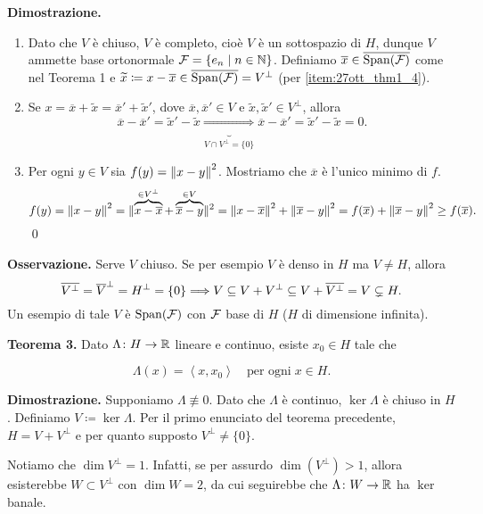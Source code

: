 \textbf{Dimostrazione.}
\begin{enumerate}
\item Dato che $V$ è chiuso, $V$ è completo, cioè $V$ è un sottospazio di $H$, dunque $V$ ammette base ortonormale $\mathcal{F} = \left\{ e_n \;\middle|\; n \in \mathbb N \right\}$.
Definiamo $\overline{x} \in \overline{\operatorname{Span}(\mathcal{F})}$ come nel Teorema 1 e $\widetilde{x} \coloneqq x - \overline{x} \in \overline{\operatorname{Span}(\mathcal{F})} = V^\perp$ (per \ref{item:27ott_thm1_4}).

\item Se $x = \overline{x} + \tilde{x} = \overline{x}' + \tilde{x}'$, dove $\overline{x}, \overline{x}' \in V$ e $\tilde{x}, \tilde{x}' \in V^\perp$, allora
%
$$
\overline{x} - \overline{x}' = \tilde{x}' - \tilde{x} \underbrace{\Longrightarrow}_{V \cap V^\perp = \{0 \} }
\overline{x} - \overline{x}' = \tilde{x}' - \tilde{x} = 0.
$$
%

\item Per ogni $y \in V$ sia $f(y) = \left\lVert x - y \right\rVert^2$. Mostriamo che $\overline{x}$ è l'unico minimo di $f$.
%
$$
f(y) = \left\lVert x - y \right\rVert^2 = \lVert{\overbrace{x - \overline{x}}^{\in V^\perp} + \overbrace{\overline{x} - y}^{\in V}}\rVert^2 = \left\lVert x - \overline{x} \right\rVert^2 + \left\lVert \overline{x} - y \right\rVert^2
= f(\overline{x}) + \left\lVert \overline{x} - y \right\rVert^2 \geq f(\overline{x}).
$$
%
\qed
\end{enumerate}

\vs

\textbf{Osservazione.}
Serve $V$ chiuso. Se per esempio $V$ è denso in $H$ ma $V \neq H$, allora
%
$$
\overline{V^\perp} = \overline{V}^\perp = H^\perp = \{0\} \Longrightarrow V \subseteq V + V^\perp \subseteq V + \overline{V^\perp} = V \subsetneq H.
$$
%
Un esempio di tale $V$ è $\operatorname{Span}(\mathcal{F})$ con $\mathcal{F}$ base di $H$ ($H$ di dimensione infinita).

\textbf{Teorema 3.} Dato $\Lambda \colon  H \to \mathbb R$ lineare e continuo, esiste $x_0 \in H$ tale che 

\begin{equation} \tag{$\ast$}
	\Lambda(x) = \left<x,x_0 \right> \quad \text{per ogni} \; x \in H.
\end{equation}

\textbf{Dimostrazione.}
Supponiamo $\Lambda \not\equiv 0$. Dato che $\Lambda$ è continuo, $\ker \Lambda$ è chiuso in $H$. Definiamo $V \coloneqq \ker \Lambda$.
Per il primo enunciato del teorema precedente, $H = V + V^\perp$ e per quanto supposto $V^\perp \neq \{0\}$.

Notiamo che $\dim V^\perp = 1$. Infatti, se per assurdo $\dim(V^\perp) > 1$, allora esisterebbe $W \subset V^\perp$ con $\dim W = 2$, da cui seguirebbe che $\Lambda \colon  W \to \mathbb R$ ha $\ker$ banale. \absurd

